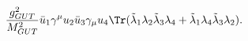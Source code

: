 \begin{equation}\label{thirdamp}
{g_{GUT}^2\over M_{GUT}^2} \bar u_1 \gamma^\mu u_2 \bar u_3 \gamma_\mu u_4
\Tr(\tilde \lambda_1
\lambda_2\tilde\lambda_3\lambda_4+\tilde\lambda_1\lambda_4\tilde\lambda_3\lambda_2).
\end{equation}

